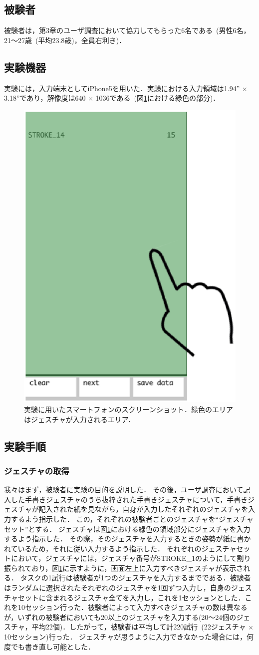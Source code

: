 \subsection{被験者}
被験者は，第3章のユーザ調査において協力してもらった6名である~(男性6名，21〜27歳~(平均23.8歳)，全員右利き)．

\subsection{実験機器}
実験には，入力端末としてiPhone5を用いた．実験における入力領域は1.94'' × 3.18''であり，解像度は640 × 1036である~(図\ref{fig:screenshot}における緑色の部分)．

\begin{figure}[!h]
\centering
\includegraphics[width=0.4\columnwidth]{img/screenshot.eps}
\caption{実験に用いたスマートフォンのスクリーンショット．緑色のエリアはジェスチャが入力されるエリア．}
\label{fig:screenshot}
\end{figure}


\subsection{実験手順}
\subsubsection{ジェスチャの取得}
我々はまず，被験者に実験の目的を説明した．
その後，ユーザ調査において記入した手書きジェスチャのうち抜粋された手書きジェスチャについて，手書きジェスチャが記入された紙を見ながら，自身が入力したそれぞれのジェスチャを入力するよう指示した．
この，それぞれの被験者ごとのジェスチャを``ジェスチャセット''とする．
ジェスチャは図\ref{fig:screenshot}における緑色の領域部分にジェスチャを入力するよう指示した．
その際，そのジェスチャを入力するときの姿勢が紙に書かれているため，それに従い入力するよう指示した．
それぞれのジェスチャセットにおいて，ジェスチャには，ジェスチャ番号がSTROKE\_1のようにして割り振られており，図\ref{fig:screenshot}に示すように，画面左上に入力すべきジェスチャが表示される．
タスクの1試行は被験者が1つのジェスチャを入力するまでである．被験者はランダムに選択されたそれぞれのジェスチャを1回ずつ入力し，自身のジェスチャセットに含まれるジェスチャ全てを入力し，これを1セッションとした．これを10セッション行った．被験者によって入力すべきジェスチャの数は異なるが，いずれの被験者においても20以上のジェスチャを入力する(20〜24個のジェスチャ，平均22個)．したがって，被験者は平均して計220試行~(22ジェスチャ $\times$ 10セッション)行った．
ジェスチャが思うように入力できなかった場合には，何度でも書き直し可能とした．

